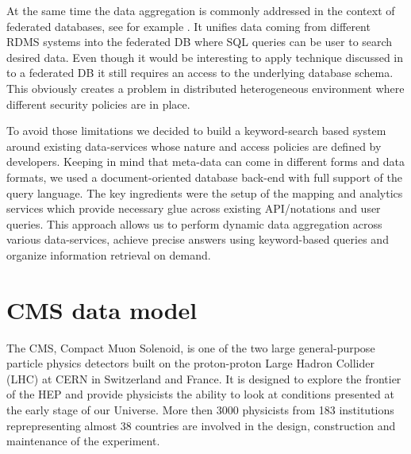 \documentclass[1p,times]{elsarticle}
\begin{document}
At the same time the data aggregation is commonly addressed in the context of
federated databases, see for example \cite{FedDB}. It unifies data coming 
from different RDMS systems into the federated DB where SQL queries can be user to 
search desired data. Even though it would be interesting to apply technique 
discussed in \cite{DBS-QL} to a federated DB it still requires 
an access to the underlying database schema. This obviously creates a problem
in distributed heterogeneous environment where different security policies
are in place.

To avoid those limitations we decided to build a keyword-search based system around
existing data-services whose nature and access policies are defined by developers.
Keeping in mind that meta-data can come in different forms and data formats,
we used a document-oriented database back-end with full support of the query language.
The key ingredients were the setup of the mapping and analytics services which provide
necessary glue across existing API/notations and user queries. This approach 
allows us to perform dynamic data aggregation across various data-services, achieve
precise answers using keyword-based queries
and organize information retrieval on demand.

\section{CMS data model\label{DataModel}}
The CMS, Compact Muon Solenoid, \cite{CMS} 
is one of the two large general-purpose particle physics detectors built on 
the proton-proton Large Hadron Collider (LHC) at CERN in Switzerland and France. 
It is designed to explore the frontier of the HEP and provide physicists
the ability to look at conditions presented at the early stage of our Universe.
More then 3000 physicists from 183 institutions reprepresenting almost 
38 countries are involved in the design, construction and maintenance of the experiment.
\end{document}
